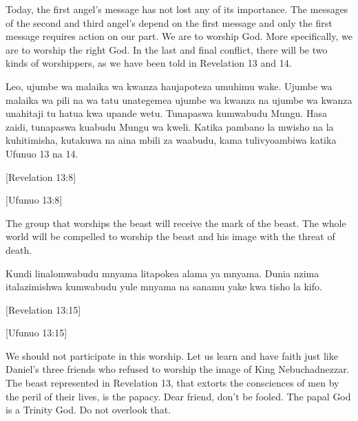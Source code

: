 Today, the first angel’s message has not lost any of its importance. The messages of the second and third angel’s depend on the first message and only the first message requires action on our part. We are to worship God. More specifically, we are to worship the right God. In the last and final conflict, there will be two kinds of worshippers, as we have been told in Revelation 13 and 14.


Leo, ujumbe wa malaika wa kwanza haujapoteza umuhimu wake. Ujumbe wa malaika wa pili na wa tatu unategemea ujumbe wa kwanza na ujumbe wa kwanza unahitaji tu hatua kwa upande wetu. Tunapaswa kumwabudu Mungu. Hasa zaidi, tunapaswa kuabudu Mungu wa kweli. Katika pambano la mwisho na la kuhitimisha, kutakuwa na aina mbili za waabudu, kama tulivyoambiwa katika Ufunuo 13 na 14.


[Revelation 13:8]


[Ufunuo 13:8]


The group that worships the beast will receive the mark of the beast. The whole world will be compelled to worship the beast and his image with the threat of death.


Kundi linalomwabudu mnyama litapokea alama ya mnyama. Dunia nzima italazimishwa kumwabudu yule mnyama na sanamu yake kwa tisho la kifo.


[Revelation 13:15]


[Ufunuo 13:15]


We should not participate in this worship. Let us learn and have faith just like Daniel’s three friends who refused to worship the image of King Nebuchadnezzar. The beast represented in Revelation 13, that extorts the consciences of men by the peril of their lives, is the papacy. Dear friend, don't be fooled. The papal God is a Trinity God. Do not overlook that.



